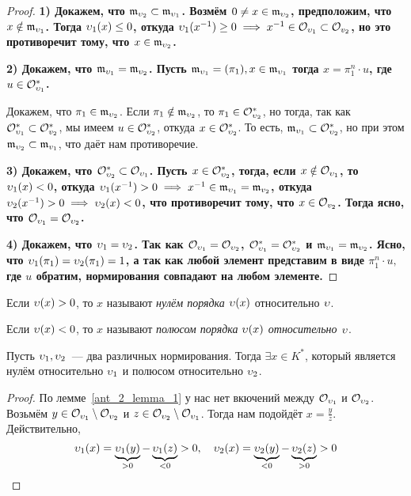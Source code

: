 	\begin{proof}
		\bf{1)} Докажем, что $\mathfrak{m}_{\upsilon_2} \subset \mathfrak{m}_{\upsilon_{1}}$. Возмём $0 \neq x \in \mathfrak{m}_{\upsilon_{2}}$, предположим, что $x \notin \mathfrak{m}_{\upsilon_{1}}$. Тогда $\upsilon_{1}(x) \le 0$, откуда $\upsilon_{1}(x^{-1})\ge 0 \implies x^{-1} \in \mathcal{O}_{\upsilon_{1}} \subset \mathcal{O}_{v_{2}}$, но это противоречит тому, что $x \in \mathfrak{m}_{\upsilon_{2}}$.

		\bf{2)} Докажем, что $\mathfrak{m}_{\upsilon_{1}} = \mathfrak{m}_{\upsilon_2}$. Пусть $\mathfrak{m}_{\upsilon_{1}} = (\pi_1), x \in \mathfrak{m}_{\upsilon_{1}}$ тогда $x = \pi_1^n \cdot u$, где $u \in \mathcal{O}_{\upsilon_{1}}^{*}$. 

		Докажем, что $\pi_1 \in \mathfrak{m}_{\upsilon_{2}}$. Если $\pi_1 \notin \mathfrak{m}_{\upsilon_{2}}$, то $\pi_1 \in \mathcal{O}_{\upsilon_{2}}^{*}$, но тогда, так как $\mathcal{O}_{\upsilon_1}^* \subset \mathcal{O}_{v_{2}}^{*}$, мы имеем $u \in \mathcal{O}_{\upsilon_2}^*$, откуда $x \in \mathcal{O}_{\upsilon_{2}}^*$. То есть, $\mathfrak{m}_{\upsilon_1} \subset \mathcal{O}_{\upsilon_2}^*$, но при этом $\mathfrak{m}_{\upsilon_{2}} \subset \mathfrak{m}_{v_{1}}$, что даёт нам противоречие. 

		\bf{3)} Докажем, что $\mathcal{O}_{\upsilon_{2}}^* \subset \mathcal{O}_{\upsilon_1}$. Пусть $x \in \mathcal{O}_{\upsilon_2}^*$, тогда, если $x \notin \mathcal{O}_{\upsilon_1}$, то $\upsilon_1(x) < 0$, откуда $\upsilon_1(x^{-1}) > 0 \implies x^{-1} \in \mathfrak{m}_{\upsilon_1} = \mathfrak{m}_{v_2}$, откуда $\upsilon_2(x^{-1}) > 0 \implies \upsilon_{2}(x) < 0$, что противоречит тому, что $x \in \mathcal{O}_{v_2}$. Тогда ясно, что $\mathcal{O}_{\upsilon_{1}} = \mathcal{O}_{\upsilon_2}$. 

		\bf{4)} Докажем, что $\upsilon_1 = \upsilon_2$. Так как $\mathcal{O}_{\upsilon_{1}} = \mathcal{O}_{\upsilon_2}$, $\mathcal{O}_{\upsilon_1}^* = \mathcal{O}_{\upsilon_2}^*$ и $\mathfrak{m}_{\upsilon_1} = \mathfrak{m}_{\upsilon_2}$. Ясно, что $\upsilon_{1}(\pi_1) = \upsilon_2(\pi_1) = 1$, а так как любой элемент представим в виде $\pi_1^n \cdot u,$ где $u$ обратим, нормирования совпадают на любом элементе.  
	\end{proof}

	\begin{definition} 
		Если $\upsilon(x) > 0$, то $x$ называют \emph{нулём порядка $\upsilon(x)$}  относительно $\upsilon$.

		Если $\upsilon(x) < 0$, то $x$ называют \emph{полюсом порядка $\upsilon(x)$ относительно $\upsilon$}.
	\end{definition}

	\begin{lemma}\label{ant_2_lemma_2}  
		Пусть $\upsilon_1, \upsilon_2$~--- два различных нормирования. Тогда $\exists x \in K^{*}$, который является нулём относительно $\upsilon_1$ и полюсом относительно $\upsilon_2$. 
	\end{lemma}
	\begin{proof}
		По лемме~\ref{ant_2_lemma_1} у нас нет вкючений между $\mathcal{O}_{\upsilon_1}$ и $\mathcal{O}_{\upsilon_2}$. Возьмём $y \in \mathcal{O}_{\upsilon_1} \setminus \mathcal{O}_{\upsilon_2}$ и $z \in \mathcal{O}_{\upsilon_2} \setminus \mathcal{O}_{\upsilon_1}$. Тогда нам подойдёт $x = \frac{y}{z}$. Действительно, 
		\[
			\upsilon_1(x) = \underbrace{\upsilon_1(y)}_{> 0} - \underbrace{\upsilon_1(z)}_{< 0} > 0, \quad \upsilon_2(x) = \underbrace{\upsilon_2(y)}_{< 0} - \underbrace{\upsilon_2(z)}_{> 0} > 0
		\]
	\end{proof}

